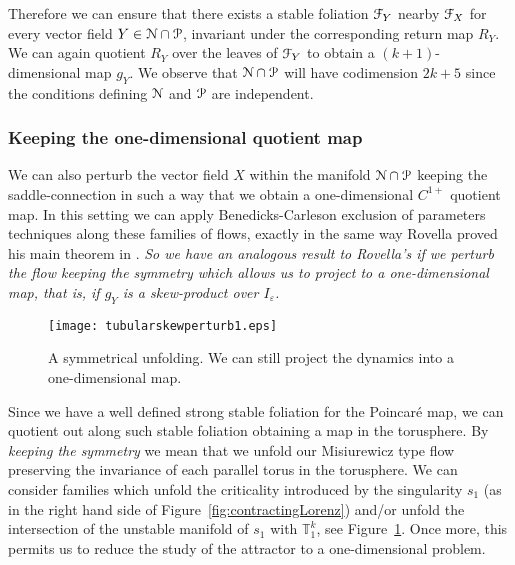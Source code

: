 \documentclass[reqno,12pt,a4paper]{amsart}
\theoremstyle{plain}
\theoremstyle{definition}
\begin{document}
Therefore we can ensure that there exists a stable foliation
${\EuScript{F}}_Y$ nearby ${\EuScript{F}}_X$ for every vector field
$Y\in{\EuScript{N}}\cap{\EuScript{P}}$, invariant under the corresponding return
map $R_Y$. 
We can again quotient $R_Y$ over the leaves of
${\EuScript{F}}_Y$ to obtain a $(k+1)$-dimensional map $g_Y$. We
observe that ${\EuScript{N}}\cap{\EuScript{P}}$ will have codimension $2k+5$ since
the conditions defining ${\EuScript{N}}$ and ${\EuScript{P}}$ are independent.

 

\subsubsection{Keeping the one-dimensional quotient map}
\label{sec:symmetr-unfold-x}

We can also perturb the vector field $X$ within the manifold
${\EuScript{N}}\cap{\EuScript{P}}$ keeping the saddle-connection in such a way
that we obtain a one-dimensional $C^{1+}$ quotient map. In
this setting we can apply Benedicks-Carleson exclusion of
parameters techniques along these families of flows, exactly
in the same way Rovella proved his main theorem in
\cite{Ro93}. \emph{So we have an analogous result to
  Rovella's if we perturb the flow keeping the symmetry
  which allows us to project to a one-dimensional map, that
  is, if $g_Y$ is a skew-product over $I_{\varepsilon}$.}

\begin{figure}[htpb]
  \centering
  \texttt{[image: tubularskewperturb1.eps]}
  \caption{\label{fig:symperturb}A symmetrical unfolding. We
    can still project the dynamics into a one-dimensional
    map.}
\end{figure}

Since we have a well defined strong
stable foliation for the Poincar\'e map, we can quotient
out along such stable foliation obtaining a map in the
torusphere. By {\em keeping the symmetry} we mean that we
unfold our Misiurewicz type flow preserving the invariance
of each parallel torus in the torusphere.  We can consider
families which unfold the criticality introduced by the
singularity $s_1$ (as in the right hand side of
Figure~\ref{fig:contractingLorenz}) and/or unfold the
intersection of the unstable manifold of $s_1$ with
${{\mathbb T}}_1^k$, see Figure~\ref{fig:symperturb}.  Once more, this
permits us to reduce the study of the attractor to a
one-dimensional problem.
\end{document}
